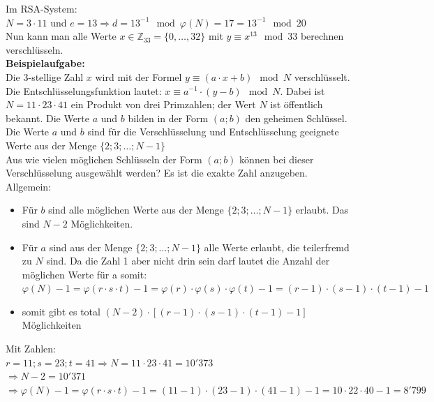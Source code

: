 \documentclass[12pt]{scrartcl}
\begin{document}
Im RSA-System: \\
$N = 3 \cdot 11$ und $e = 13 \Rightarrow d = 13^{-1} \mod \varphi(N) = 17 = 13^{-1} \mod 20$ \\

Nun kann man alle Werte $x \in \mathbb{Z}_{33} = \{0, \dots, 32\}$ mit $y \equiv x^{13} \mod 33$ berechnen
verschlüsseln.\\

\vspace{0.5cm}
\textbf{Beispielaufgabe:}\\
Die 3-stellige Zahl $x$ wird mit der Formel $y \equiv (a \cdot x + b ) \mod N$ verschlüsselt. Die 
Entschlüsselungsfunktion lautet: $x \equiv a^{-1} \cdot (y - b) \mod N$. Dabei ist $N = 11 \cdot 23 \cdot 41$ 
ein Produkt von drei Primzahlen; der Wert $N$ ist öffentlich bekannt. Die Werte $a$ und $b$ bilden in der Form $(a; b)$ 
den geheimen Schlüssel. Die Werte $a$ und $b$ sind für die Verschlüsselung und Entschlüsselung geeignete Werte aus
der Menge $\{2; 3; \dots ; N - 1\}$\\

Aus wie vielen möglichen Schlüsseln der Form $(a; b)$ können bei dieser Verschlüsselung ausgewählt werden? 
Es ist die exakte Zahl anzugeben.\\

Allgemein:\\
\begin{itemize}
    \item Für $b$ sind alle möglichen Werte aus der Menge $\{2;3;\dots;N-1\}$ erlaubt. Das sind $N-2$ Möglichkeiten.
    \item Für $a$ sind aus der Menge $\{2;3;\dots;N-1\}$ alle Werte erlaubt, die teilerfremd zu $N$ sind. Da die Zahl 1
            aber nicht drin sein darf lautet die Anzahl der möglichen Werte für a somit:
            $\varphi(N) - 1 = \varphi(r \cdot s \cdot t) - 1 = \varphi(r) \cdot \varphi(s) \cdot \varphi(t) - 1 = (r-1) \cdot (s-1) \cdot (t-1) - 1$
    \item somit gibt es total $(N-2) \cdot [(r-1) \cdot (s-1) \cdot (t-1) - 1]$ Möglichkeiten
\end{itemize}


\vspace{0.5cm}
Mit Zahlen:\\
$r = 11; s = 23; t = 41 \Rightarrow N = 11 \cdot 23 \cdot 41 = 10'373$\\

$\Rightarrow N -2 = 10'371$\\
$\Rightarrow \varphi(N) - 1 = \varphi(r \cdot s \cdot t) -1 = (11 - 1) \cdot (23 - 1) \cdot (41 - 1) - 1 = 10 \cdot 22 \cdot 40 - 1 = 8'799$\\
\end{document}
